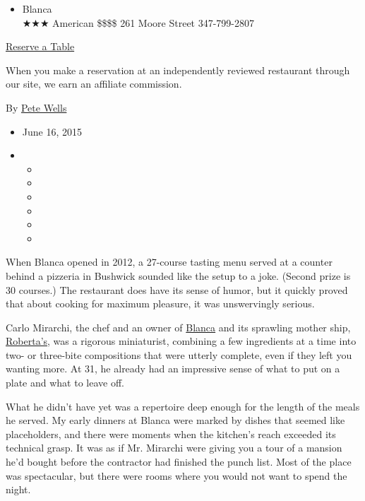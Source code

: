 \begin{itemize}
\tightlist
\item
  Blanca\\
  ★★★ American \$\$\$\$ 261 Moore Street 347-799-2807
\end{itemize}

\href{https://www.yelpreservations.com/r/blanca/}{Reserve a Table}

When you make a reservation at an independently reviewed restaurant
through our site, we earn an affiliate commission.

By \href{http://www.nytimes3xbfgragh.onion/by/pete-wells}{Pete Wells}

\begin{itemize}
\item
  June 16, 2015
\item
  \begin{itemize}
  \item
  \item
  \item
  \item
  \item
  \item
  \end{itemize}
\end{itemize}

When Blanca opened in 2012, a 27-course tasting menu served at a counter
behind a pizzeria in Bushwick sounded like the setup to a joke. (Second
prize is 30 courses.) The restaurant does have its sense of humor, but
it quickly proved that about cooking for maximum pleasure, it was
unswervingly serious.

Carlo Mirarchi, the chef and an owner of
\href{http://www.blancanyc.com/}{Blanca} and its sprawling mother ship,
\href{http://www.nytimes3xbfgragh.onion/2011/08/24/dining/reviews/robertas-nyc-restaurant-review.html}{Roberta's},
was a rigorous miniaturist, combining a few ingredients at a time into
two- or three-bite compositions that were utterly complete, even if they
left you wanting more. At 31, he already had an impressive sense of what
to put on a plate and what to leave off.

What he didn't have yet was a repertoire deep enough for the length of
the meals he served. My early dinners at Blanca were marked by dishes
that seemed like placeholders, and there were moments when the kitchen's
reach exceeded its technical grasp. It was as if Mr. Mirarchi were
giving you a tour of a mansion he'd bought before the contractor had
finished the punch list. Most of the place was spectacular, but there
were rooms where you would not want to spend the night.


